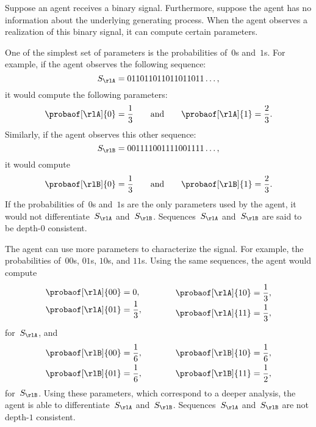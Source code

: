 \begin{example}
Suppose an agent receives a binary signal.
Furthermore, suppose the agent has no information about the underlying generating process.
When the agent observes a realization of this binary signal, it can compute certain parameters.

One of the simplest set of parameters is the probabilities of~\(0\)s and~\(1\)s.
For example, if the agent observes the following sequence:
\[
S\param{\rlA} = 011011011011011011\dots,
\]
it would compute the following parameters:
\[
\probaof[\rlA]{0} = \frac{1}{3} \qquad \text{and}\qquad \probaof[\rlA]{1} = \frac{2}{3}.
\]
Similarly, if the agent observes this other sequence:
\[
S\param{\rlB}= 001111001111001111\dots,
\]
it would compute
\[
\probaof[\rlB]{0} = \frac{1}{3} \qquad \text{and}\qquad \probaof[\rlB]{1} = \frac{2}{3}.
\]
If the probabilities of~\(0\)s and~\(1\)s are the only parameters used by the agent, it would not differentiate~\(S\param{\rlA}\) and~\(S\param{\rlB}\).
Sequences~\(S\param{\rlA}\) and~\(S\param{\rlB}\) are said to be depth-\(0\) consistent.

The agent can use more parameters to characterize the signal.
For example, the probabilities of~\(00\)s, \(01\)s, \(10\)s, and \(11\)s.
Using the same sequences, the agent would compute
\[
\begin{aligned}
&\probaof[\rlA]{00} = 0,\\
&\probaof[\rlA]{01} = \frac{1}{3},
\end{aligned}
\qquad\qquad
\begin{aligned}
&\probaof[\rlA]{10} = \frac{1}{3}, \\
&\probaof[\rlA]{11} = \frac{1}{3},
\end{aligned}
\]
for~\(S\param{\rlA}\), and
\[
\begin{aligned}
&\probaof[\rlB]{00} = \frac{1}{6},\\
&\probaof[\rlB]{01} = \frac{1}{6},
\end{aligned}
\qquad\qquad
\begin{aligned}
&\probaof[\rlB]{10} = \frac{1}{6}, \\
&\probaof[\rlB]{11} = \frac{1}{2},
\end{aligned}
\]
for~\(S\param{\rlB}\).
Using these parameters, which correspond to a deeper analysis, the agent is able to differentiate~\(S\param{\rlA}\) and~\(S\param{\rlB}\).
Sequences~\(S\param{\rlA}\) and~\(S\param{\rlB}\) are not depth-\(1\) consistent.
\end{example}

